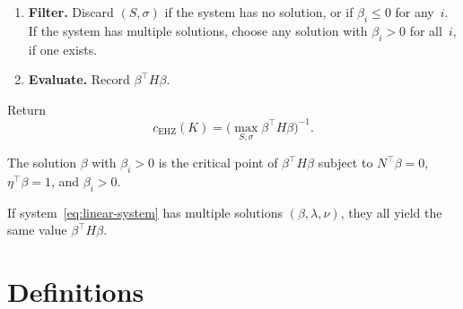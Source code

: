 \begin{algorithm}
\begin{enumerate}
\item \textbf{Filter.}
  Discard $(S, \sigma)$ if the system has no solution, or
  if $\beta_i \leq 0$ for any~$i$.
  If the system has multiple solutions, choose any solution
  with $\beta_i > 0$ for all~$i$, if one exists.

\item \textbf{Evaluate.}
  Record $\beta^\top H \beta$.
\end{enumerate}

\noindent
Return
\begin{equation}\label{eq:action-formula}
  c_{\mathrm{EHZ}}(K) = \bigl(\max_{S,\sigma} \beta^\top H \beta\bigr)^{-1}.
\end{equation}
\end{algorithm}

\begin{remark}\label{rem:critical-point}
The solution $\beta$ with $\beta_i > 0$
is the critical point of $\beta^\top H \beta$
subject to $N^\top \beta = 0$,
$\eta^\top \beta = 1$, and $\beta_i > 0$.
\end{remark}

\begin{lemma}\label{lem:well-defined}
If system~\eqref{eq:linear-system} has multiple solutions
$(\beta, \lambda, \nu)$, they all yield the same value
$\beta^\top H \beta$.
\end{lemma}


\section{Definitions}\label{sec:definitions}

